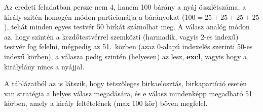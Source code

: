 \documentclass{article}
\newcommand{\just}[1]{\boxed{#1}}%
\newcommand{\excl}{\mathbf{excl}}
\begin{document}
	Az eredeti feladatban persze nem 4, hanem 100 bárány a nyáj összlétszáma, a király szitén homogén módon particionálja a bárányokat ($100 = 25+25+25+25$), tehát minden egyes testvér 50 birkát számolhat meg. A válasz analóg módon az, hogy szintén a kezdőtestvérrel szemközti (harmadik, vagyis 2-es indexű) testvér fog felelni, mégpedig az 51.~körben (azaz 0-alapú indexelés szerinti 50-es indexű körben), a válasza pedig szintén (helyesen) az lesz, $\just\excl$, vagyis hogy a királylány nincs a nyájjal.

	A táblázatból az is látszik, hogy tetszőleges birkaelosztás, birkapartíció esetén van stratégia a helyes válasz megadására, és e válasz mindenképp megadható 51 körben, amely a király feltételének (max 100 kör) bőven megfelel.

	\begin{comment}

	Ilyenfajta, a teendőken egész világosan megmutató táblázatra gondolok:


\end{comment}
\end{document}

